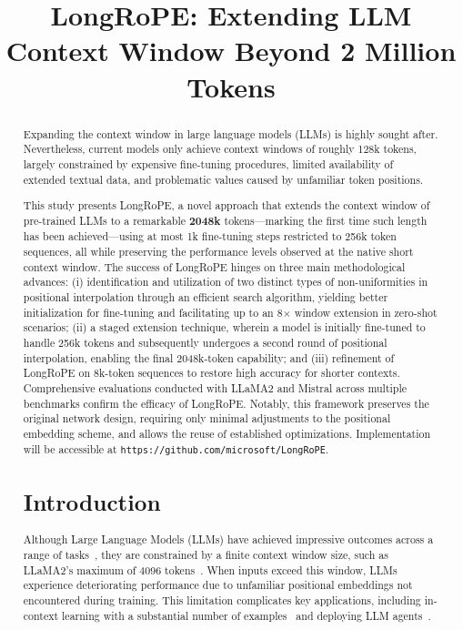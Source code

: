 \title{LongRoPE: Extending LLM Context Window Beyond 2 Million Tokens}

\begin{abstract}
Expanding the context window in large language models (LLMs) is highly sought after. Nevertheless, current models only achieve context windows of roughly 128k tokens, largely constrained by expensive fine-tuning procedures, limited availability of extended textual data, and problematic values caused by unfamiliar token positions.

This study presents LongRoPE, a novel approach that extends the context window of pre-trained LLMs to a remarkable \textbf{2048k} tokens—marking the first time such length has been achieved—using at most 1k fine-tuning steps restricted to 256k token sequences, all while preserving the performance levels observed at the native short context window. The success of LongRoPE hinges on three main methodological advances: (i) identification and utilization of two distinct types of non-uniformities in positional interpolation through an efficient search algorithm, yielding better initialization for fine-tuning and facilitating up to an 8$\times$ window extension in zero-shot scenarios; (ii) a staged extension technique, wherein a model is initially fine-tuned to handle 256k tokens and subsequently undergoes a second round of positional interpolation, enabling the final 2048k-token capability; and (iii) refinement of LongRoPE on 8k-token sequences to restore high accuracy for shorter contexts. Comprehensive evaluations conducted with LLaMA2 and Mistral across multiple benchmarks confirm the efficacy of LongRoPE. Notably, this framework preserves the original network design, requiring only minimal adjustments to the positional embedding scheme, and allows the reuse of established optimizations. Implementation will be accessible at \texttt{https://github.com/microsoft/LongRoPE}.

\section{Introduction}

Although Large Language Models (LLMs) have achieved impressive outcomes across a range of tasks~\cite{gpt4,llama2}, they are constrained by a finite context window size, such as LLaMA2’s maximum of 4096 tokens~\cite{llama2}. When inputs exceed this window, LLMs experience deteriorating performance due to unfamiliar positional embeddings not encountered during training. This limitation complicates key applications, including in-context learning with a substantial number of examples~\cite{Huang2023FewerIM} and deploying LLM agents~\cite{park2023generative,madaan2023selfrefine}.


\end{abstract}

